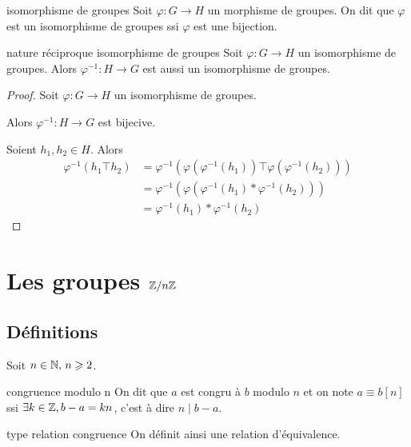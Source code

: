 \begin{definition}{isomorphisme de groupes}{}
    Soit $\varphi : G \to H$ un morphisme de groupes. On dit que $\varphi$ est un isomorphisme 
    de groupes ssi $\varphi$ est une bijection. 
\end{definition}

\begin{theoreme}{nature réciproque isomorphisme de groupes}{}
    Soit $\varphi : G \to H$ un isomorphisme de groupes. Alors $\varphi^{-1} : H \to G$ est aussi un isomorphisme de
    groupes.
\end{theoreme}


\begin{proof}
    Soit $\varphi : G \to H$ un isomorphisme de groupes. 

    Alors $\varphi^{-1} : H \to G$ est bijecive. 

    Soient $h_1, h_2 \in H$. Alors 
    \begin{align*}
        \varphi^{-1}(h_1 \top h_2) & = \varphi^{-1}(\varphi(\varphi^{-1}(h_1)) \top \varphi(\varphi^{-1}(h_2)))\\
        & = \varphi^{-1}(\varphi(\varphi^{-1}(h_1) \ast \varphi^{-1}(h_2))) \\
        & = \varphi^{-1}(h_1) \ast \varphi^{-1}(h_2)
    \end{align*}
\end{proof}


\section{Les groupes \texorpdfstring{$\mathbb{Z} / n \mathbb{Z}$}{Z/nZ}}
\subsection{Définitions }

Soit $n \in \mathbb{N}, \, n \geqslant 2$.

\begin{definition}{congruence modulo n}{}
    On dit que $a$ est congru à $b$ modulo $n$ et on note $a \equiv b [n]$ ssi
    $\exists k \in \mathbb{Z}, b - a = kn$, c'est à dire $n \mid b - a$.    
\end{definition}

\begin{propositionnt}{type relation congruence}{}
    On définit ainsi une relation d'équivalence.
\end{propositionnt}

